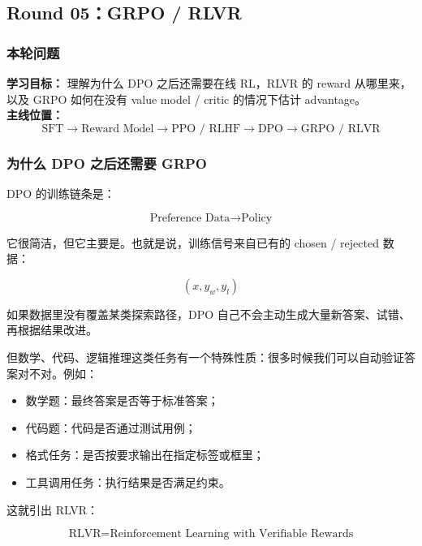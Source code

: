 
\subsection{Round 05：GRPO / RLVR}

\subsubsection{本轮问题}

\begin{conceptbox}
\textbf{学习目标：} 理解为什么 DPO 之后还需要在线 RL，RLVR 的 reward 从哪里来，以及 GRPO 如何在没有 value model / critic 的情况下估计 advantage。\\
\textbf{主线位置：}
\[
\text{SFT} \to \text{Reward Model} \to \text{PPO / RLHF} \to \text{DPO} \to \text{GRPO / RLVR}
\]
\end{conceptbox}

\subsubsection{为什么 DPO 之后还需要 GRPO}

DPO 的训练链条是：

\[
\text{Preference Data}
\to
\text{Policy}
\]

它很简洁，但它主要是。也就是说，训练信号来自已有的 chosen / rejected 数据：

\[
(x, y_w, y_l)
\]

如果数据里没有覆盖某类探索路径，DPO 自己不会主动生成大量新答案、试错、再根据结果改进。

但数学、代码、逻辑推理这类任务有一个特殊性质：很多时候我们可以自动验证答案对不对。例如：

\begin{itemize}[leftmargin=1.5em]
  \item 数学题：最终答案是否等于标准答案；
  \item 代码题：代码是否通过测试用例；
  \item 格式任务：是否按要求输出在指定标签或框里；
  \item 工具调用任务：执行结果是否满足约束。
\end{itemize}

这就引出 RLVR：

\[
\text{RLVR} = \text{Reinforcement Learning with Verifiable Rewards}
\]

